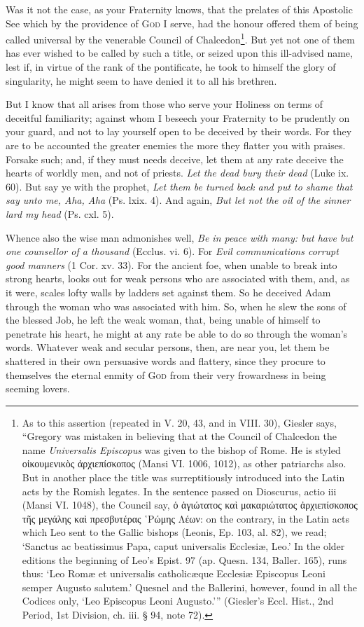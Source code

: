 Was it not the case, as your Fraternity knows, that the prelates of this Apostolic See which by the providence of \textsc{God} I serve, had the honour offered them of being called universal by the venerable Council of Chalcedon\footnote{As to this assertion (repeated in V. 20, 43, and in VIII. 30), Giesler says, “Gregory was mistaken in believing that at the Council of Chalcedon the name \emph{Universalis Episcopus} was given to the bishop of Rome. He is styled \textgreek{οἰκουμενικὸς ἀρχιεπίσκοπος} (Mansi VI. 1006, 1012), as other patriarchs also. But in another place the title was surreptitiously introduced into the Latin acts by the Romish legates. In the sentence passed on Dioscurus, actio iii (Mansi VI. 1048), the Council say, \textgreek{ὁ ἁγιώτατος καὶ μακαριώτατος ἀρχιεπίσκοπος τῆς μεγάλης καὶ πρεσβυτέρας ῾Ρώμης Λέων}: on the contrary, in the Latin acts which Leo sent to the Gallic bishops (Leonis, Ep. 103, al. 82), we read; ‘Sanctus ac beatissimus Papa, caput universalis Ecclesiæ, Leo.’ In the older editions the beginning of Leo’s Epist. 97 (ap. Quesn. 134, Baller. 165), runs thus: ‘Leo Romæ et universalis catholicæque Ecclesiæ Episcopus Leoni semper Augusto salutem.’ Quesnel and the Ballerini, however, found in all the Codices only, ‘Leo Episcopus Leoni Augusto.’” (Giesler’s Eccl. Hist., 2nd Period, 1st Division, ch. iii. § 94, note 72).}. But yet not one of them has ever wished to be called by such a title, or seized upon this ill-advised name, lest if, in virtue of the rank of the pontificate, he took to himself the glory of singularity, he might seem to have denied it to all his brethren.

But I know that all arises from those who serve your Holiness on terms of deceitful familiarity; against whom I beseech your Fraternity to be prudently on your guard, and not to lay yourself open to be deceived by their words. For they are to be accounted the greater enemies the more they flatter you with praises. Forsake such; and, if they must needs deceive, let them at any rate deceive the hearts of worldly men, and not of priests. \emph{Let the dead bury their dead} (Luke ix. 60). But say ye with the prophet, \emph{Let them be turned back and put to shame that say unto me, Aha, Aha} (Ps. lxix. 4). And again, \emph{But let not the oil of the sinner lard my head} (Ps. cxl. 5).

Whence also the wise man admonishes well, \emph{Be in peace with many: but have but one counsellor of a thousand} (Ecclus. vi. 6). For \emph{Evil communications corrupt good manners} (1 Cor. xv. 33). For the ancient foe, when unable to break into strong hearts, looks out for weak persons who are associated with them, and, as it were, scales lofty walls by ladders set against them. So he deceived Adam through the woman who was associated with him. So, when he slew the sons of the blessed Job, he left the weak woman, that, being unable of himself to penetrate his heart, he might at any rate be able to do so through the woman’s words. Whatever weak and secular persons, then, are near you, let them be shattered in their own persuasive words and flattery, since they procure to themselves the eternal enmity of \textsc{God} from their very frowardness in being seeming lovers.

